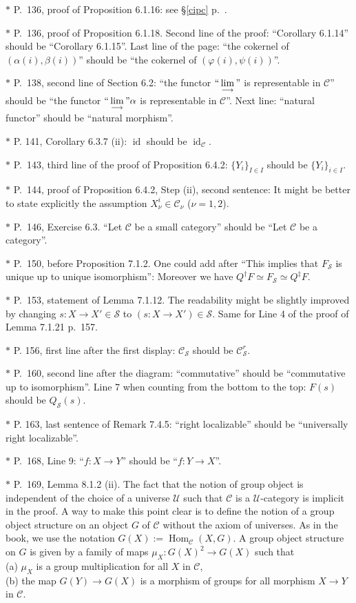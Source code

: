 \documentclass[12pt]{article}%
\theoremstyle{remark}
\theoremstyle{definition}
\newcommand{\cc}{\mathcal}
\newcommand{\C}{\mathcal C}
\newcommand{\SSS}{\mathcal S}
\newcommand{\U}{\mathcal U}
\DeclareMathOperator{\id}{id}
\DeclareMathOperator{\Hom}{Hom}%
\begin{document}
\noindent $*$ P.~136, proof of Proposition 6.1.16: see \S\ref{cipc} p.~\pageref{cipc}.

\noindent $*$ P.~136, proof of Proposition 6.1.18. Second line of the proof: ``Corollary 6.1.14'' should be ``Corollary 6.1.15''. Last line of the page: ``the cokernel of $(\alpha(i),\beta(i))$'' should be ``the cokernel of $(\varphi(i),\psi(i))$''.

\noindent $*$ P.~138, second line of Section 6.2: ``the functor $``\displaystyle\lim_{\longrightarrow}"$ is representable in $\C$'' should be ``the functor $``\displaystyle\lim_{\longrightarrow}"\alpha$ is representable in $\C$''. Next line: ``natural functor'' should be ``natural morphism''.

\noindent $*$ P. 141, Corollary 6.3.7 (ii): $\id$ should be $\id_\C$.

\noindent $*$ P.~143, third line of the proof of Proposition 6.4.2: $\{Y_i\}_{I\in I}$ should be $\{Y_i\}_{i\in I}$.

\noindent $*$ P.~144, proof of Proposition 6.4.2, Step (ii), second sentence: It might be better to state explicitly the assumption $X_\nu^i\in\C_\nu$ ($\nu=1,2$). 

\noindent $*$ P.~146, Exercise 6.3. ``Let $\C$ be a small category'' should be ``Let $\C$ be a category''.

\noindent $*$ P.~150, before Proposition 7.1.2. One could add after ``This implies that $F_{\SSS}$ is unique up to unique isomorphism'': Moreover we have $Q^\dagger F\simeq F_{\SSS}\simeq Q^\ddagger F$.

\noindent $*$ P.~153, statement of Lemma 7.1.12. The readability might be slightly improved by changing $s:X\to X'\in\mathcal S$ to $(s:X\to X')\in\mathcal S$. Same for Line 4 of the proof of Lemma 7.1.21 p.~157.

\noindent $*$ P. 156, first line after the first display: $\C_{\cc S}$ should be $\C_{\cc S}^r$.

\noindent $*$ P.~160, second line after the diagram: ``commutative'' should be ``commutative up to isomorphism''. Line 7 when counting from the bottom to the top: $F(s)$ should be $Q_{\mathcal S}(s)$.

$*$ P. 163, last sentence of Remark 7.4.5: ``right localizable'' should be ``universally right localizable''.

\noindent $*$ P.~168, Line 9: ``$f:X\to Y$'' should be ``$f:Y\to X$''.

\noindent $*$ P.~169, Lemma 8.1.2 (ii). The fact that the notion of group object is independent of the choice of a universe $\U$ such that $\C$ is a $\U$-category is implicit in the proof. A way to make this point clear is to define the notion of a group object structure on an object $G$ of $\C$ without the axiom of universes. As in the book, we use the notation $G(X):=\Hom_\C(X,G)$. A group object structure on $G$ is given by a family of maps $\mu_X:G(X)^2\to G(X)$ such that\\ 
\noindent(a) $\mu_X$ is a group multiplication for all $X$ in $\C$,\\ 
\noindent(b) the map $G(Y)\to G(X)$ is a morphism of groups for all morphism $X\to Y$ in $\C$.
\end{document}
